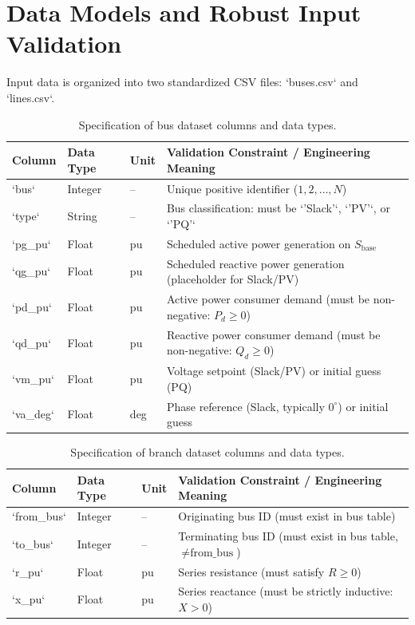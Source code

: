 \documentclass[12pt,a4paper,oneside]{report}
\begin{document}
\section{Data Models and Robust Input Validation}
Input data is organized into two standardized CSV files: `buses.csv` and `lines.csv`.

\begin{table}[htbp]
\centering
\caption{Specification of bus dataset columns and data types.}
\label{tab:bus_schema}
\small
\begin{tabular}{llll}
\toprule
\textbf{Column} & \textbf{Data Type} & \textbf{Unit} & \textbf{Validation Constraint / Engineering Meaning} \\
\midrule
`bus` & Integer & -- & Unique positive identifier ($1, 2, \dots, N$) \\
`type` & String & -- & Bus classification: must be `'Slack'`, `'PV'`, or `'PQ'` \\
`pg_pu` & Float & pu & Scheduled active power generation on $S_{\text{base}}$ \\
`qg_pu` & Float & pu & Scheduled reactive power generation (placeholder for Slack/PV) \\
`pd_pu` & Float & pu & Active power consumer demand (must be non-negative: $P_d \ge 0$) \\
`qd_pu` & Float & pu & Reactive power consumer demand (must be non-negative: $Q_d \ge 0$) \\
`vm_pu` & Float & pu & Voltage setpoint (Slack/PV) or initial guess (PQ) \\
`va_deg` & Float & deg & Phase reference (Slack, typically $0^\circ$) or initial guess \\
\bottomrule
\end{tabular}
\end{table}

\begin{table}[htbp]
\centering
\caption{Specification of branch dataset columns and data types.}
\label{tab:line_schema}
\small
\begin{tabular}{llll}
\toprule
\textbf{Column} & \textbf{Data Type} & \textbf{Unit} & \textbf{Validation Constraint / Engineering Meaning} \\
\midrule
`from_bus` & Integer & -- & Originating bus ID (must exist in bus table) \\
`to_bus` & Integer & -- & Terminating bus ID (must exist in bus table, $\neq \text{from\_bus}$) \\
`r_pu` & Float & pu & Series resistance (must satisfy $R \ge 0$) \\
`x_pu` & Float & pu & Series reactance (must be strictly inductive: $X > 0$) \\
\bottomrule
\end{tabular}
\end{table}
\end{document}
